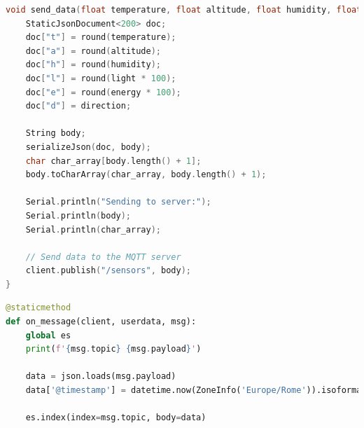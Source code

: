 \begin{lstlisting}[style=mystyle,language=C,caption={Snippet of our \texttt{send\_data} function which serializes our sensor data into JSON and sends it over the MQTT broker.}]
void send_data(float temperature, float altitude, float humidity, float light, float energy, String direction) {
    StaticJsonDocument<200> doc;
    doc["t"] = round(temperature);
    doc["a"] = round(altitude);
    doc["h"] = round(humidity);
    doc["l"] = round(light * 100);
    doc["e"] = round(energy * 100);
    doc["d"] = direction;

    String body;
    serializeJson(doc, body);
    char char_array[body.length() + 1];
    body.toCharArray(char_array, body.length() + 1);

    Serial.println("Sending to server:");
    Serial.println(body);
    Serial.println(char_array);

    // Send data to the MQTT server
    client.publish("/sensors", body);
}
\end{lstlisting}

\begin{lstlisting}[style=mystyle,language=Python,caption={Snippet of our \texttt{on\_message} function which is triggered every time the MQTT server receives a message from the broker. It ingests the data into ElasticSearch.}]
@staticmethod
def on_message(client, userdata, msg):
    global es
    print(f'{msg.topic} {msg.payload}')

    data = json.loads(msg.payload)
    data['@timestamp'] = datetime.now(ZoneInfo('Europe/Rome')).isoformat()

    es.index(index=msg.topic, body=data)
\end{lstlisting}
